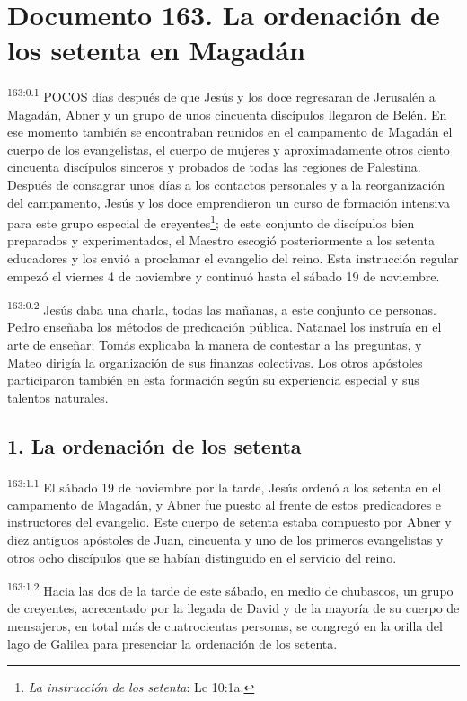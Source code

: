 \chapter{Documento 163. La ordenación de los setenta en Magadán}
\par
\textsuperscript{163:0.1} POCOS días después de que Jesús y los doce regresaran de Jerusalén a Magadán, Abner y un grupo de unos cincuenta discípulos llegaron de Belén. En ese momento también se encontraban reunidos en el campamento de Magadán el cuerpo de los evangelistas, el cuerpo de mujeres y aproximadamente otros ciento cincuenta discípulos sinceros y probados de todas las regiones de Palestina. Después de consagrar unos días a los contactos personales y a la reorganización del campamento, Jesús y los doce emprendieron un curso de formación intensiva para este grupo especial de creyentes\footnote{\textit{La instrucción de los setenta}: Lc 10:1a.}; de este conjunto de discípulos bien preparados y experimentados, el Maestro escogió posteriormente a los setenta educadores y los envió a proclamar el evangelio del reino. Esta instrucción regular empezó el viernes 4 de noviembre y continuó hasta el sábado 19 de noviembre.

\par
\textsuperscript{163:0.2} Jesús daba una charla, todas las mañanas, a este conjunto de personas. Pedro enseñaba los métodos de predicación pública. Natanael los instruía en el arte de enseñar; Tomás explicaba la manera de contestar a las preguntas, y Mateo dirigía la organización de sus finanzas colectivas. Los otros apóstoles participaron también en esta formación según su experiencia especial y sus talentos naturales.

\section*{1. La ordenación de los setenta}
\par
\textsuperscript{163:1.1} El sábado 19 de noviembre por la tarde, Jesús ordenó a los setenta en el campamento de Magadán, y Abner fue puesto al frente de estos predicadores e instructores del evangelio. Este cuerpo de setenta estaba compuesto por Abner y diez antiguos apóstoles de Juan, cincuenta y uno de los primeros evangelistas y otros ocho discípulos que se habían distinguido en el servicio del reino.

\par
\textsuperscript{163:1.2} Hacia las dos de la tarde de este sábado, en medio de chubascos, un grupo de creyentes, acrecentado por la llegada de David y de la mayoría de su cuerpo de mensajeros, en total más de cuatrocientas personas, se congregó en la orilla del lago de Galilea para presenciar la ordenación de los setenta.

